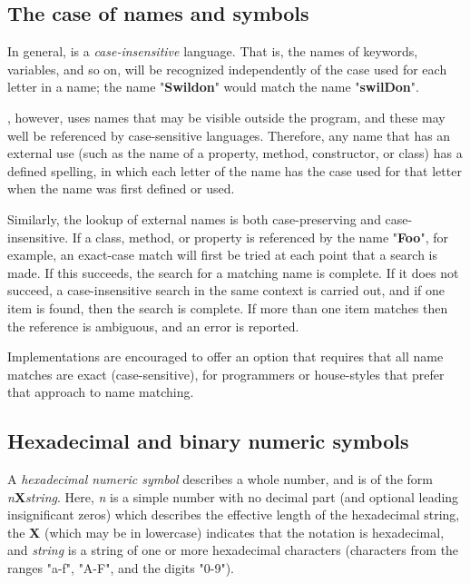 \subsection{The case of names and symbols}\label{refcase}
 
In general, \nr{} is a \emph{case-insensitive} language.
That is, the names of keywords, variables, and so on, will be recognized
independently of the case used for each letter in a name; the name
"\textbf{Swildon}" would match the name
"\textbf{swilDon}".
 
\nr{}, however, uses names that may be visible outside the \nr{}
program, and these may well be referenced by case-sensitive languages.
Therefore, any name that has an external use (such as the name of a
property, method, constructor, or class) has a defined spelling, in
which each letter of the name has the case used for that letter when the
name was first defined or used.
 
Similarly, the lookup of external names is both case-preserving and
case-insensitive.  If a class, method, or property is referenced by the
name "\textbf{Foo}", for example, an exact-case match will first
be tried at each point that a search is made.
If this succeeds, the search for a matching name is complete.
If it does not succeed, a case-insensitive search in the same context
is carried out, and if one item is found, then the search is complete.
If more than one item matches then the reference is ambiguous, and an
error is reported.
 
Implementations are encouraged to offer an option that requires that all
name matches are exact (case-sensitive), for programmers or house-styles
that prefer that approach to name matching.
\subsection{Hexadecimal and binary numeric symbols}\label{refhexbin}
 
A \emph{hexadecimal numeric symbol} describes a whole number, and is
of the form \emph{n}\textbf{X}\emph{string}.  Here,
\emph{n} is a simple number with no decimal part (and optional
leading insignificant zeros) which describes the effective length of the
hexadecimal string, the \textbf{X} (which may be in lowercase) indicates
that the notation is hexadecimal, and \emph{string} is a string of
one or more hexadecimal characters (characters from the ranges
"a-f", "A-F", and the digits "0-9").
 
